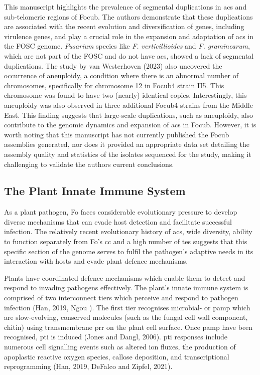 This manuscript highlights the prevalence of segmental duplications in \acp{ac} and sub-telomeric regions of \ac{Focub}. The authors demonstrate that these duplications are associated with the recent evolution and diversification of genes, including virulence genes, and play a crucial role in the expansion and adaptation of \acp{ac} in the \ac{FOSC} genome. \textit{Fusarium} species like \textit{F. verticillioides} and \textit{F. graminearum}, which are not part of the \ac{FOSC} and do not have \acp{ac}, showed a lack of segmental duplications.  The study by van Westerhoven \et (2023) also uncovered the occurrence of aneuploidy, a condition where there is an abnormal number of chromosomes, specifically for chromosome 12 in  \ac{Focub4} strain II5. This chromosome was found to have two (nearly) identical copies. Interestingly, this aneuploidy was also observed in three additional \ac{Focub4} strains from the Middle East. This finding suggests that large-scale duplications, such as aneuploidy, also contribute to the genomic dynamics and expansion of \acp{ac} in \ac{Focub}. However, it is worth noting that this manuscript has not currently published the \ac{Focub} assemblies generated, nor does it provided an appropriate data set detailing the assembly quality and statistics of the isolates sequenced for the study, making it challenging to validate the authors current conclusions. 

\subsection{The Plant Innate Immune System}

As a plant pathogen, \ac{Fo} faces considerable evolutionary pressure to develop diverse mechanisms that can evade host detection and facilitate successful infection. The relatively recent evolutionary history of \acp{ac}, wide diversity, ability to function separately from \ac{Fo}'s \ac{cc} and a high number of \acp{te} suggests that this specific section of the genome serves to fulfil the pathogen's adaptive needs in its interaction with hosts and evade plant defence mechanisms.

Plants have coordinated defence mechanisms which enable them to detect and respond to invading pathogens effectively. The plant’s innate immune system is comprised of two interconnect tiers which perceive and respond to pathogen infection (Han, 2019, Ngou ). The first tier recognises microbial- or \ac{pamp} which are slow-evolving, conserved molecules (such as the fungal cell wall component, chitin) using transmembrane \ac{prr} on the plant cell surface. Once \ac{pamp} have been recognised, \ac{pti} is induced (Jones and Dangl, 2006). \Ac{pti} responses include numerous cell signalling events such as altered ion fluxes, the production of apoplastic reactive oxygen species, callose deposition, and transcriptional reprogramming (Han, 2019, DeFalco and Zipfel, 2021). 

